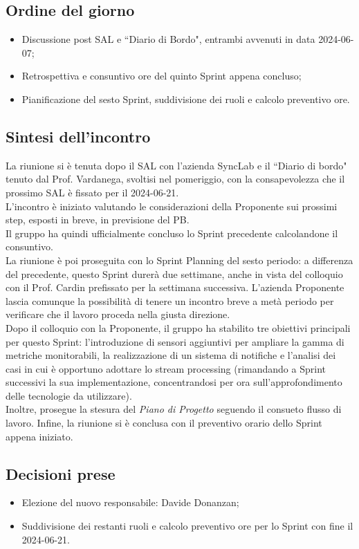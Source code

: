 \documentclass[8pt]{article}
\begin{document}
\subsection{Ordine del giorno}
\begin{itemize}
	\setlength\itemsep{0em}
  \item Discussione post SAL e ``Diario di Bordo", entrambi avvenuti in data 2024-06-07;
    \item Retrospettiva e consuntivo ore del quinto Sprint appena concluso;
    \item Pianificazione del sesto Sprint, suddivisione dei ruoli e calcolo preventivo ore.
\end{itemize}
\subsection{Sintesi dell'incontro}
La riunione si è tenuta dopo il SAL con l'azienda SyncLab e il ``Diario di bordo" tenuto dal Prof. Vardanega, svoltisi nel pomeriggio, con la
consapevolezza che il prossimo SAL è fissato per il 2024-06-21. \\ L'incontro è iniziato
valutando le considerazioni della Proponente sui prossimi step, esposti in breve, in previsione del PB. \\Il gruppo ha quindi ufficialmente concluso lo Sprint
precedente calcolandone il consuntivo. \\
La riunione è poi proseguita con lo Sprint Planning del sesto periodo: a differenza del precedente, questo Sprint durerà due
settimane, anche in vista del colloquio con il Prof. Cardin prefissato per la settimana successiva. L'azienda Proponente lascia comunque la possibilità di tenere un incontro breve a metà periodo per verificare che il lavoro proceda nella giusta direzione. \\
Dopo il colloquio con la Proponente, il gruppo ha stabilito tre obiettivi principali per questo Sprint: l'introduzione di sensori aggiuntivi per ampliare la gamma di metriche monitorabili, la realizzazione di un sistema di notifiche e
l'analisi dei casi in cui è opportuno adottare lo stream processing (rimandando a Sprint successivi la sua
implementazione, concentrandosi per ora sull'approfondimento delle tecnologie da utilizzare).
\\Inoltre, prosegue la stesura del \textit{Piano di Progetto} seguendo il consueto flusso di lavoro. Infine, la
riunione si è conclusa con il preventivo orario dello Sprint appena iniziato.
\subsection{Decisioni prese}
\begin{itemize}
	\setlength\itemsep{0em}
    \item Elezione del nuovo responsabile: Davide Donanzan;
    \item Suddivisione dei restanti ruoli e calcolo preventivo ore per lo Sprint con fine il
        2024-06-21.
\end{itemize}
\newpage
\end{document}
